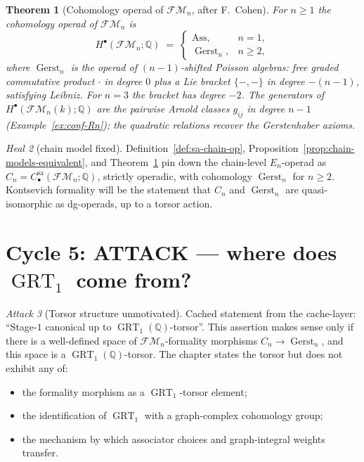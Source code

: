 \documentclass[11pt]{article}
\newtheorem{theorem}{Theorem}[section]
\theoremstyle{definition}
\theoremstyle{remark}
\newtheorem{attack}[theorem]{Attack}
\newtheorem{heal}[theorem]{Heal}
\DeclareMathOperator{\Gerst}{Gerst}
\DeclareMathOperator{\GRT}{GRT}
\newcommand{\FM}{\mathcal{FM}}
\begin{document}
\begin{theorem}[Cohomology operad of $\FM_n$, after F.~Cohen]
\label{thm:fm-cohomology}
For $n \geq 1$ the cohomology operad of $\FM_n$ is
\[
 H^\bullet(\FM_n; \mathbb{Q}) \;=\;
 \begin{cases}
  \mathrm{Ass}, & n = 1, \\
  \Gerst_n, & n \geq 2,
 \end{cases}
\]
where $\Gerst_n$ is the operad of $(n-1)$-shifted Poisson algebras:
free graded commutative product $\cdot$ in degree $0$ plus a Lie
bracket $\{-, -\}$ in degree $-(n-1)$, satisfying Leibniz. For $n = 3$
the bracket has degree $-2$. The generators of $H^\bullet(\FM_n(k);
\mathbb{Q})$ are the pairwise Arnold classes $g_{ij}$ in degree $n-1$
(Example~\ref{ex:conf-Rn}); the quadratic relations recover
the Gerstenhaber axioms.
\end{theorem}

\begin{heal}[chain model fixed]
\label{heal:cycle-4}
Definition~\ref{def:sa-chain-op}, Proposition~\ref{prop:chain-models-equivalent},
and Theorem~\ref{thm:fm-cohomology} pin down the chain-level $E_n$-operad
as $C_n = C^{\mathrm{sa}}_\bullet(\FM_n; \mathbb{Q})$, strictly operadic,
with cohomology $\Gerst_n$ for $n \geq 2$. Kontsevich formality will
be the statement that $C_n$ and $\Gerst_n$ are quasi-isomorphic as
dg-operads, up to a torsor action.
\end{heal}

\section{Cycle 5: ATTACK --- where does $\GRT_1$ come from?}

\begin{attack}[Torsor structure unmotivated]
\label{att:cycle-5}
Cached statement from the cache-layer: ``Stage-$1$ canonical up to
$\GRT_1(\mathbb{Q})$-torsor''. This assertion makes sense only if there
is a well-defined space of $\FM_n$-formality morphisms
$C_n \to \Gerst_n$, and this space is a $\GRT_1(\mathbb{Q})$-torsor.
The chapter states the torsor but does not exhibit any of:
\begin{itemize}
 \item the formality morphism as a $\GRT_1$-torsor element;
 \item the identification of $\GRT_1$ with a graph-complex
       cohomology group;
 \item the mechanism by which associator choices and graph-integral
       weights transfer.
\end{itemize}
\end{attack}
\end{document}
